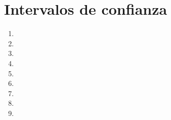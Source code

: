 \documentclass[letterpaper,spanish,11pt]{article}
\begin{document}
\section{Intervalos de confianza}

\begin{enumerate}
\item 
\item 
\item 
\item 
\item 
\item 
\item 
\item 
\item 
\end{enumerate}
\end{document}
